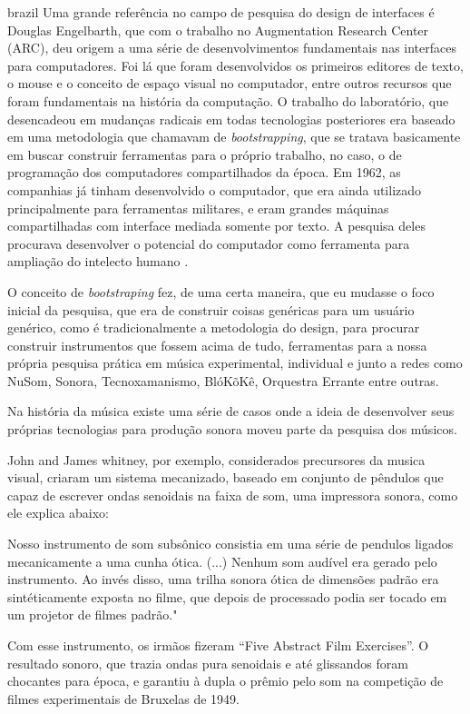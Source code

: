 \begin{otherlanguage*}{brazil}
Uma grande referência no campo de pesquisa do design de interfaces é Douglas Engelbarth, que com o trabalho no Augmentation Research Center (ARC), deu origem a uma série de desenvolvimentos fundamentais nas interfaces para computadores. Foi lá que foram desenvolvidos os primeiros editores de texto, o mouse e o conceito de espaço visual no computador, entre outros recursos que foram fundamentais na história da computação. O trabalho do laboratório, que desencadeou em mudanças radicais em todas tecnologias posteriores era baseado em uma metodologia que chamavam de \emph{bootstrapping}, que se tratava basicamente em buscar construir ferramentas para o próprio trabalho, no caso, o de programação dos computadores compartilhados da época. Em 1962, as companhias já tinham desenvolvido o computador, que era ainda utilizado principalmente para ferramentas militares, e eram grandes máquinas compartilhadas com interface mediada somente por texto. A pesquisa deles procurava desenvolver o potencial do computador como ferramenta para ampliação do intelecto humano \cite{Engelbart1962}.

O conceito de \emph{bootstraping} fez, de uma certa maneira, que eu mudasse o foco inicial da pesquisa, que era de construir coisas genéricas para um usuário genérico, como é tradicionalmente a metodologia do design, para procurar construir instrumentos que fossem acima de tudo, ferramentas para a nossa própria pesquisa prática em música experimental, individual e junto a redes como NuSom, Sonora, Tecnoxamanismo, BlóKõKê, Orquestra Errante entre outras.

Na história da música existe uma série de casos onde a ideia de desenvolver seus próprias tecnologias para produção sonora moveu parte da pesquisa dos músicos.

John and James whitney, por exemplo, considerados precursores da musica visual, criaram um sistema mecanizado, baseado em conjunto de pêndulos que capaz de escrever ondas senoidais na faixa de som, uma impressora sonora, como ele explica abaixo:
\begin{citacao}
Nosso instrumento de som subsônico consistia em uma série de pendulos ligados mecanicamente a uma cunha ótica. (...) Nenhum som audível era gerado pelo instrumento. Ao invés disso, uma trilha sonora ótica de dimensões padrão era sintéticamente exposta no filme, que depois de processado podia ser tocado em um projetor de filmes padrão."\cite[152]{Whitney1980} 
\end{citacao}

Com esse instrumento, os irmãos fizeram ``Five Abstract Film Exercises''. O resultado sonoro, que trazia ondas pura senoidais e até glissandos foram chocantes para época, e garantiu à dupla o prêmio pelo som na competição de filmes experimentais de Bruxelas de 1949.


\end{otherlanguage*}
